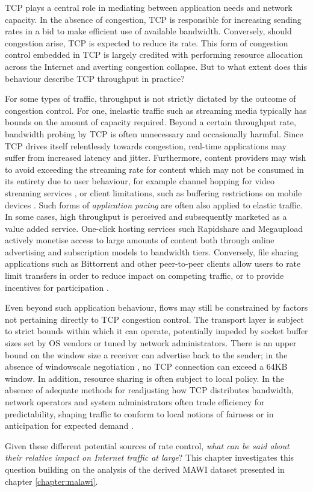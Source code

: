 \ac{TCP} plays a central role in mediating between application needs and network capacity.
In the absence of congestion, \ac{TCP} is responsible for increasing sending rates in a bid to make efficient use of available bandwidth.
Conversely, should congestion arise, \ac{TCP} is expected to reduce its rate.
This form of congestion control embedded in \ac{TCP} is largely credited with performing resource allocation across the Internet and averting congestion collapse.
But to what extent does this behaviour describe \ac{TCP} throughput in practice?

For some types of traffic, throughput is not strictly dictated by the outcome of congestion control.
For one, inelastic traffic such as streaming media typically has bounds on the amount of capacity required.
Beyond a certain throughput rate, bandwidth probing by \ac{TCP} is often unnecessary and occasionally harmful.
Since \ac{TCP} drives itself relentlessly towards congestion, real-time applications may suffer from increased latency and jitter.
Furthermore, content providers may wish to avoid exceeding the streaming rate for content which may not be consumed in its entirety due to user behaviour, for example channel hopping for video streaming services \cite{iptvWorkload}, or client limitations, such as buffering restrictions on mobile devices \cite{Rao:2011p547}.
Such forms of \emph{application pacing} are often also applied to elastic traffic.
In some cases, high throughput is perceived and subsequently marketed as a value added service.
One-click hosting services such Rapidshare and Megaupload \cite{oneclick1, SanjuasCuxart:2012p588} actively monetise access to large amounts of content both through online advertising and subscription models to bandwidth tiers.
Conversely, file sharing applications such as Bittorrent and other peer-to-peer clients allow users to rate limit transfers in order to reduce impact on competing traffic, or to provide incentives for participation \cite{bittorrentIMC}.

Even beyond such application behaviour, flows may still be constrained by factors not pertaining directly to \ac{TCP} congestion control.
The transport layer is subject to strict bounds within which it can operate, potentially impeded by socket buffer sizes set by \acf{OS} vendors or tuned by network administrators. 
There is an upper bound on the window size a receiver can advertise back to the sender; in the absence of windowscale negotiation \cite{braden1989rfc}, no \ac{TCP} connection can exceed a 64KB window. 
In addition, resource sharing is often subject to local policy.
In the absence of adequate methods for readjusting how \ac{TCP} distributes bandwidth, network operators and system administrators often trade efficiency for predictability, shaping traffic to conform to local notions of fairness or in anticipation for expected demand \cite{ispTrafficShaping}.

Given these different potential sources of rate control, \emph{what can be said about their relative impact on Internet traffic at large}?
This chapter investigates this question building on the analysis of the derived \ac{MAWI} dataset presented in chapter \ref{chapter:malawi}.

